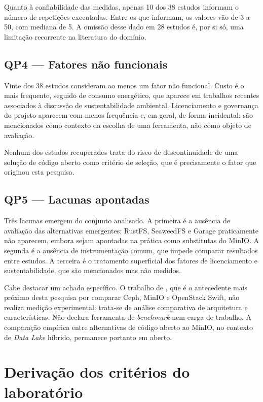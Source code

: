 Quanto à confiabilidade das medidas, apenas 10 dos 38 estudos informam o número
de repetições executadas. Entre os que informam, os valores vão de 3 a 50, com
mediana de 5. A omissão desse dado em 28 estudos é, por si só, uma limitação
recorrente na literatura do domínio.

\subsection{QP4 --- Fatores não funcionais}

Vinte dos 38 estudos consideram ao menos um fator não funcional. Custo é o mais
frequente, seguido de consumo energético, que aparece em trabalhos recentes
associados à discussão de sustentabilidade ambiental. Licenciamento e governança
do projeto aparecem com menos frequência e, em geral, de forma incidental: são
mencionados como contexto da escolha de uma ferramenta, não como objeto de
avaliação.

Nenhum dos estudos recuperados trata do risco de descontinuidade de uma solução
de código aberto como critério de seleção, que é precisamente o fator que
originou esta pesquisa.

\subsection{QP5 --- Lacunas apontadas}

Três lacunas emergem do conjunto analisado. A primeira é a ausência de avaliação
das alternativas emergentes: RustFS, SeaweedFS e Garage praticamente não
aparecem, embora sejam apontadas na prática como substitutas do MinIO. A segunda
é a ausência de instrumentação comum, que impede comparar resultados entre
estudos. A terceira é o tratamento superficial dos fatores de licenciamento e
sustentabilidade, que são mencionados mas não medidos.

Cabe destacar um achado específico. O trabalho de
\citep{tast2026comparative}, que é o antecedente mais próximo desta
pesquisa por comparar Ceph, MinIO e OpenStack Swift, não realiza medição
experimental: trata-se de análise comparativa de arquitetura e características.
Não declara ferramenta de \textit{benchmark} nem carga de trabalho. A
comparação empírica entre alternativas de código aberto ao MinIO, no contexto de
\textit{Data Lake} híbrido, permanece portanto em aberto.

\section{Derivação dos critérios do laboratório}
\label{sec:derivacao}

